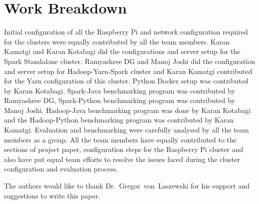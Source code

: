 \section{Work Breakdown}

Initial configuration of all the Raspberry Pi and network configuration 
required for the clusters were equally contributed by all the team members.
Karan Kamatgi and Karan Kotabagi did the configurations and server setup for the
Spark Standalone cluster. Ramyashree DG and Manoj Joshi did the configuration 
and server setup for Hadoop-Yarn-Spark cluster and Karan Kamatgi contributed for
the Yarn configuration of this cluster. Python Docker setup was contributed by 
Karan Kotabagi. Spark-Java benchmarking program was contributed by Ramyashree 
DG, Spark-Python benchmarking program was contributed by Manoj Joshi. 
Hadoop-Java benchmarking program was done by Karan Kotabagi and the 
Hadoop-Python benchmarking program was contributed by Karan Kamatgi. Evaluation 
and benchmarking were carefully analysed by all the team members as a group. All
the team members have equally contributed to the sections of project paper, 
configuration steps for the Raspberry Pi cluster and also have put equal team 
efforts to resolve the issues faced during the cluster configuration and 
evaluation process.




\begin{acks}

  The authors would like to thank Dr.~Gregor~von~Laszewski 
  for his support and suggestions to write this paper.
  
\end{acks}


